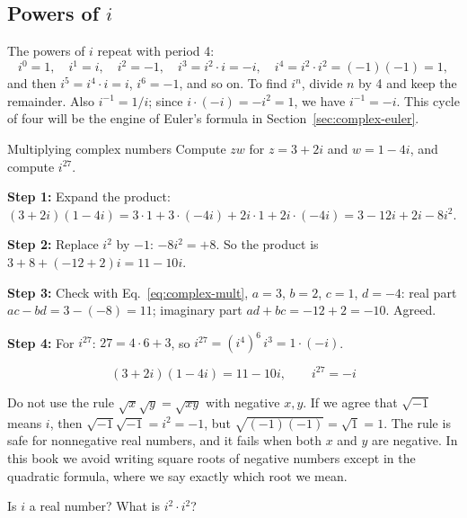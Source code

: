 \subsection{Powers of $i$}

The powers of $i$ repeat with period 4:
\begin{equation}
i^0=1,\quad i^1=i,\quad i^2=-1,\quad i^3=i^2\cdot i=-i,\quad i^4=i^2\cdot i^2=(-1)(-1)=1,\label{eq:complex-ipowers}
\end{equation}
and then $i^5=i^4\cdot i=i$, $i^6=-1$, and so on. To find $i^n$, divide $n$ by 4 and keep the remainder. Also $i^{-1}=1/i$; since $i\cdot(-i)=-i^2=1$, we have $i^{-1}=-i$. This cycle of four will be the engine of Euler's formula in Section~\ref{sec:complex-euler}.

\begin{sample}{Multiplying complex numbers}
Compute $zw$ for $z=3+2i$ and $w=1-4i$, and compute $i^{27}$.

\textbf{Step 1:} Expand the product: $(3+2i)(1-4i)=3\cdot1+3\cdot(-4i)+2i\cdot1+2i\cdot(-4i)=3-12i+2i-8i^2$.

\textbf{Step 2:} Replace $i^2$ by $-1$: $-8i^2=+8$. So the product is $3+8+(-12+2)i=11-10i$.

\textbf{Step 3:} Check with Eq.~\eqref{eq:complex-mult}, $a=3$, $b=2$, $c=1$, $d=-4$: real part $ac-bd=3-(-8)=11$; imaginary part $ad+bc=-12+2=-10$. Agreed.

\textbf{Step 4:} For $i^{27}$: $27=4\cdot6+3$, so $i^{27}=(i^4)^6\,i^3=1\cdot(-i)$.

\[
\boxed{(3+2i)(1-4i)=11-10i,\qquad i^{27}=-i}
\]
\end{sample}

\begin{pitfall}
Do not use the rule $\sqrt{x}\sqrt{y}=\sqrt{xy}$ with negative $x,y$. If we agree that $\sqrt{-1}$ means $i$, then $\sqrt{-1}\sqrt{-1}=i^2=-1$, but $\sqrt{(-1)(-1)}=\sqrt1=1$. The rule is safe for nonnegative real numbers, and it fails when both $x$ and $y$ are negative. In this book we avoid writing square roots of negative numbers except in the quadratic formula, where we say exactly which root we mean.
\end{pitfall}

\begin{checkpoint}
Is $i$ a real number? What is $i^2\cdot i^2$?
\end{checkpoint}

